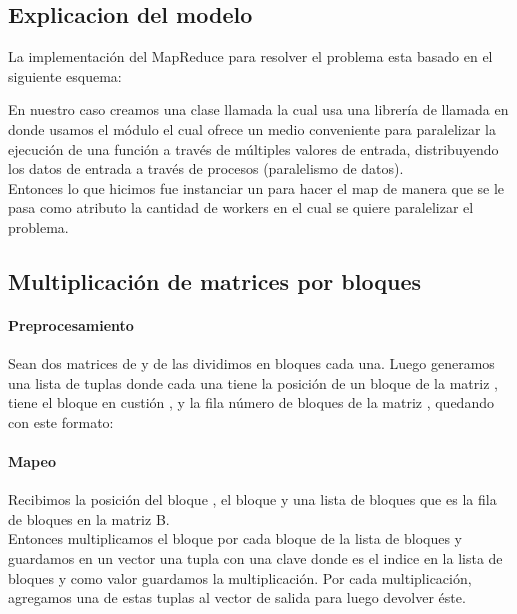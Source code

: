 \subsection{Explicacion del modelo}
    La implementación del MapReduce para resolver el problema esta basado en el
    siguiente esquema:\\

    \def\text{Esquema de un map reduce}
    \def\path{map_reduce_schema.png}
    \def\scale{.6}
    

    En nuestro caso creamos una clase llamada  la cual usa una
    librería de  llamada  en donde usamos el
    módulo  el cual ofrece un medio conveniente para paralelizar la
    ejecución de una función a través de múltiples valores de entrada, distribuyendo
    los datos de entrada a través de procesos (paralelismo de datos).\\

    Entonces lo que hicimos fue instanciar un  para hacer el map de
    manera que se le pasa como atributo la cantidad de workers en el cual se
    quiere paralelizar el problema.

\subsection{Multiplicación de matrices por bloques}

    \paragraph{Preprocesamiento}

        Sean dos matrices  de  y  de  las
        dividimos en  bloques cada una. Luego generamos una
        lista de tuplas donde cada una tiene la posición  de un bloque
        de la matriz , tiene el bloque en custión ,
        y la fila número  de bloques de la matriz , quedando
        con este formato: \\

    \paragraph{Mapeo}

        Recibimos la posición  del bloque , el bloque
         y una lista de bloques  que es la fila  de
        bloques en la matriz B.\\
        Entonces multiplicamos el bloque  por cada bloque de la lista de
        bloques  y guardamos en un vector una tupla con una clave
         donde  es el indice en la lista de
        bloques  y como valor guardamos la multiplicación. Por cada
        multiplicación, agregamos una de estas tuplas al vector de salida para
        luego devolver éste.

